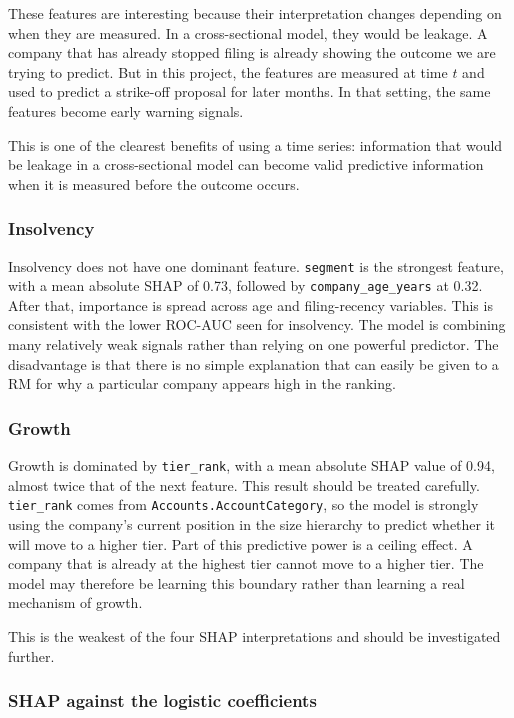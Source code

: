 \documentclass[    author={Samuel Menon Demelo; Sneha Saphala Ram Prasad; 
Viktor Ander Lindholm; Vishal Khatri},
               supervisor={Prof. Fernando Moreno-Pino},
                   degree={MSc},
                    title={Lloyds Commercial Banking Intelligence},
                 subtitle={Ranking SME Lending, Risk and Growth Prospects for Lloyds Banking Group},
                     type={},
                     year={2026}]{dissertation}
\begin{document}
These features are interesting because their interpretation changes depending on when they are measured. In a cross-sectional model, they would be leakage. A company that has already stopped filing is already showing the outcome we are trying to predict. But in this project, the features are measured at time $t$ and used to predict a strike-off proposal for later months. In that setting, the same features become early warning signals.

This is one of the clearest benefits of using a time series: information that would be leakage in a cross-sectional model can become valid predictive information when it is measured before the outcome occurs.

\subsubsection{Insolvency}
Insolvency does not have one dominant feature. \texttt{segment} is the strongest feature, with a mean absolute SHAP of 0.73, followed by \texttt{company\_age\_years} at 0.32. After that, importance is spread across age and filing-recency variables. This is consistent with the lower ROC-AUC seen for insolvency. The model is combining many relatively weak signals rather than relying on one powerful predictor. The disadvantage is that there is no simple explanation that can easily be given to a RM for why a particular company appears high in the ranking.

\subsubsection{Growth}
Growth is dominated by \texttt{tier\_rank}, with a mean absolute SHAP value of 0.94, almost twice that of the next feature. This result should be treated carefully. \texttt{tier\_rank} comes from \texttt{Accounts.AccountCategory}, so the model is strongly using the company's current position in the size hierarchy to predict whether it will move to a higher tier. Part of this predictive power is a ceiling effect. A company that is already at the highest tier cannot move to a higher tier. The model may therefore be learning this boundary rather than learning a real mechanism of growth.

This is the weakest of the four SHAP interpretations and should be investigated further.

\subsubsection{SHAP against the logistic coefficients}
\end{document}
